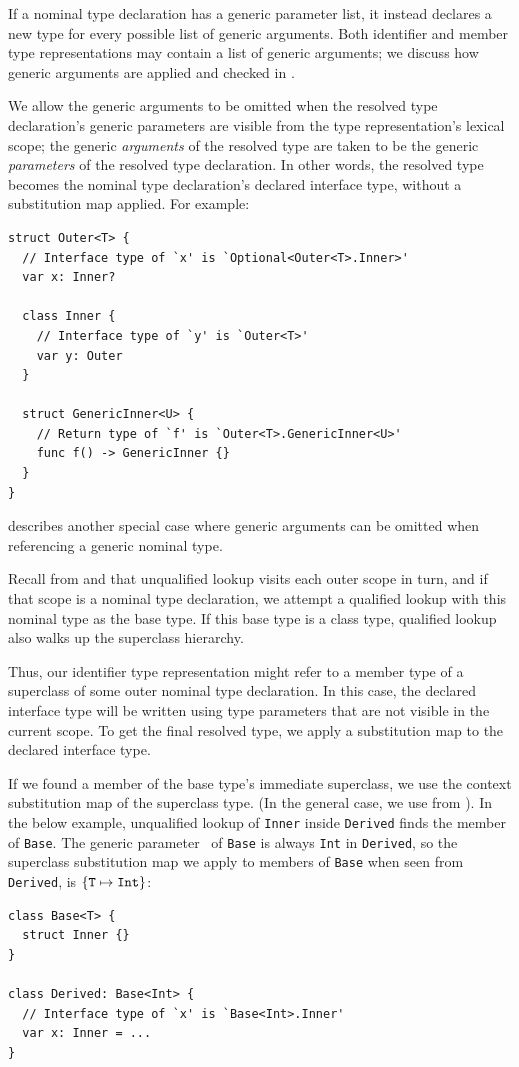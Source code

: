 \documentclass[../generics]{subfiles}
\begin{document}
If a nominal type declaration has a generic parameter list, it instead declares a new type for every possible list of generic arguments. Both identifier and member type representations may contain a list of generic arguments; we discuss how generic arguments are applied and checked in .

We allow the generic arguments to be omitted when the resolved type declaration's generic parameters are visible from the type representation's lexical scope; the generic \emph{arguments} of the resolved type are taken to be the generic \emph{parameters} of the resolved type declaration. In other words, the resolved type becomes the nominal type declaration's declared interface type, without a substitution map applied. For example:
\begin{Verbatim}
struct Outer<T> {
  // Interface type of `x' is `Optional<Outer<T>.Inner>'
  var x: Inner?

  class Inner {
    // Interface type of `y' is `Outer<T>'
    var y: Outer
  }

  struct GenericInner<U> {
    // Return type of `f' is `Outer<T>.GenericInner<U>'
    func f() -> GenericInner {}
  }
}
\end{Verbatim}
 describes another special case where generic arguments can be omitted when referencing a generic nominal type.

Recall from  and  that unqualified lookup visits each outer scope in turn, and if that scope is a nominal type declaration, we attempt a qualified lookup with this nominal type as the base type. If this base type is a class type, qualified lookup also walks up the superclass hierarchy.

Thus, our identifier type representation might refer to a member type of a superclass of some outer nominal type declaration. In this case, the declared interface type will be written using type parameters that are not visible in the current scope. To get the final resolved type, we apply a substitution map to the declared interface type.

If we found a member of the base type's immediate superclass, we use the context substitution map of the superclass type. (In the general case, we use  from ). In the below example, unqualified lookup of \texttt{Inner} inside \texttt{Derived} finds the member of \texttt{Base}. The generic parameter \tT\ of \texttt{Base} is always \texttt{Int} in \texttt{Derived}, so the superclass substitution map we apply to members of \texttt{Base} when seen from \texttt{Derived}, is $\{\texttt{T} \mapsto \texttt{Int}\}$:
\begin{Verbatim}
class Base<T> {
  struct Inner {}
}

class Derived: Base<Int> {
  // Interface type of `x' is `Base<Int>.Inner'
  var x: Inner = ...
}
\end{Verbatim}
\end{document}
